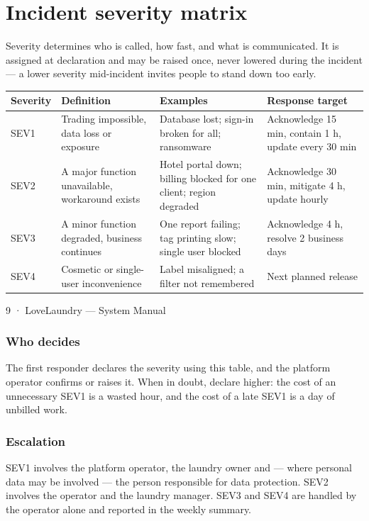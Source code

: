 \documentclass[11pt,a4paper,oneside]{book}
\begin{document}
\section*{Incident severity matrix}
Severity determines who is called, how fast, and what is communicated. It is assigned at declaration and may be raised once, never lowered during the incident — a lower severity mid-incident invites people to stand down too early.

\begin{center}\small
\begin{tabularx}{\linewidth}{|X|X|X|X|}
\hline
\rowcolor{lightgrey}
\textbf{Severity} & \textbf{Definition} & \textbf{Examples} & \textbf{Response target} \\ \hline
SEV1 & Trading impossible, data loss or exposure & Database lost; sign-in broken for all; ransomware & Acknowledge 15 min, contain 1 h, update every 30 min \\ \hline
SEV2 & A major function unavailable, workaround exists & Hotel portal down; billing blocked for one client; region degraded & Acknowledge 30 min, mitigate 4 h, update hourly \\ \hline
SEV3 & A minor function degraded, business continues & One report failing; tag printing slow; single user blocked & Acknowledge 4 h, resolve 2 business days \\ \hline
SEV4 & Cosmetic or single-user inconvenience & Label misaligned; a filter not remembered & Next planned release \\ \hline
\end{tabularx}
\end{center}
9 · LoveLaundry — System Manual

\subsubsection*{Who decides}
The first responder declares the severity using this table, and the platform operator confirms or raises it. When in doubt, declare higher: the cost of an unnecessary SEV1 is a wasted hour, and the cost of a late SEV1 is a day of unbilled work.

\subsubsection*{Escalation}
SEV1 involves the platform operator, the laundry owner and — where personal data may be involved — the person responsible for data protection. SEV2 involves the operator and the laundry manager. SEV3 and SEV4 are handled by the operator alone and reported in the weekly summary.
\end{document}
